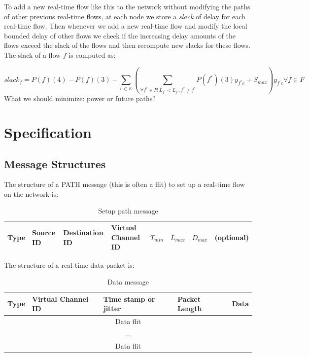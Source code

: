 \documentclass[10pt]{article}
\begin{document}
To add a new real-time flow like this to the network without modifying the paths
of other previous real-time flows, at each node we store a {\em slack} of delay
for each real-time flow. Then whenever we add a new real-time flow and modify the local
bounded delay of other flows we check if the increasing delay amounts of the flows
exceed the slack of the flows and then recompute new slacks for these flows. The slack
of a flow $f$ is computed as:

\begin{equation}
	slack_f=P(f)(4)-P(f)(3) - 
\sum_{e \in E} (\sum_{\forall f^{*} \in F:L_{f^{*}} < L_{f^{'}}, f^{*} \neq f^{'}}P(f^{*})(3)y_{f^{*}e}+S_{max})y_{f^{'}e} 
 \forall f \in F
\end{equation}
What we should minimize: power or future paths?

\section{Specification}
\subsection{Message Structures}
The structure of a PATH message (this is often a flit) to set up a real-time 
flow on the network is:

\begin{table}[h]
\begin{center}
  \begin{tabular}{ | l | l | l | l | l | l | l | l | }
    \hline
	Type & Source ID & Destination ID & Virtual Channel ID & 
	$T_{min}$ & $L_{max}$ & $D_{max}$ & (optional) \\
    \hline
  \end{tabular}
\end{center}
\caption{Setup path message}
\label{table:PathMsg}
\end{table}

The structure of a real-time data packet is:

\begin{table}[h]
\begin{center}
  \begin{tabular}{ | l | l | l | l | l |}
    \hline
	Type & Virtual Channel ID & Time stamp or jitter & Packet Length & Data \\ \hline
	\multicolumn{5}{|c|}{Data flit} \\ \hline
	\multicolumn{5}{|c|}{...} \\ \hline
	\multicolumn{5}{|c|}{Data flit} \\
    \hline
  \end{tabular}
\end{center}
\caption{Data message}
\label{table:DataMsg}
\end{table}
\end{document}
